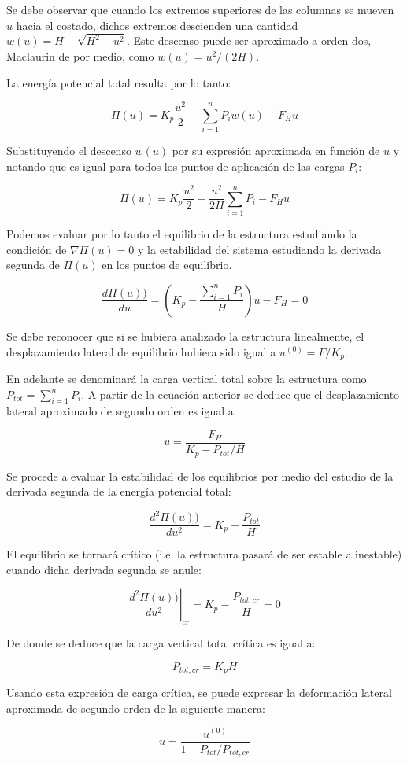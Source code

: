 Se debe observar que cuando los extremos superiores de las columnas se mueven $u$ hacia el costado, dichos extremos descienden una cantidad $w(u)=H-\sqrt{H^2-u^2}$. Este descenso puede ser aproximado a orden dos, Maclaurin de por medio, como $w(u)=u^2/(2H)$.

La energía potencial total resulta por lo tanto:

$$\Pi(u)=K_p \frac{u^2}{2} -\sum_{i=1}^n P_i w(u) - F_H u$$

Substituyendo el descenso $w(u)$ por su expresión aproximada en función de $u$ y notando que es igual para todos los puntos de aplicación de las cargas $P_i$:

$$\Pi(u)=K_p \frac{u^2}{2} -\frac {u^2}{2H} \sum_{i=1}^n P_i - F_H u$$

Podemos evaluar por lo tanto el equilibrio de la estructura estudiando la condición de $\nabla \Pi(u)=0$ y la estabilidad del sistema estudiando la derivada segunda de $\Pi(u)$ en los puntos de equilibrio.

$$\frac{d \Pi(u))}{d u} = \left(K_p-\frac{\sum_{i=1}^n P_i}{H}\right)u - F_H = 0$$

Se debe reconocer que si se hubiera analizado la estructura linealmente, el desplazamiento lateral de equilibrio hubiera sido igual a $u^{(0)}=F/K_p$.

En adelante se denominará la carga vertical total sobre la estructura como $P_{tot}=\sum_{i=1}^n P_i$. A partir de la ecuación anterior se deduce que el desplazamiento lateral aproximado de segundo orden es igual a:

$$u=\frac{F_H}{K_p - P_{tot}/H}$$

Se procede a evaluar la estabilidad de los equilibrios por medio del estudio de la derivada segunda de la energía potencial total:

$$\frac{d^2 \Pi(u))}{d u^2} = K_p-\frac{P_{tot}}{H}$$

El equilibrio se tornará crítico (i.e. la estructura pasará de ser estable a inestable) cuando dicha derivada segunda se anule:

$$\left.\frac{d^2 \Pi(u))}{d u^2}\right|_{cr} = K_p-\frac{P_{tot,cr}}{H}=0$$

De donde se deduce que la carga vertical total crítica es igual a:

$$P_{tot,cr} = K_p H$$

Usando esta expresión de carga crítica, se puede expresar la deformación lateral aproximada de segundo orden de la siguiente manera:

$$u=\frac{u^{(0)}}{1 - P_{tot}/P_{tot,cr}}$$

